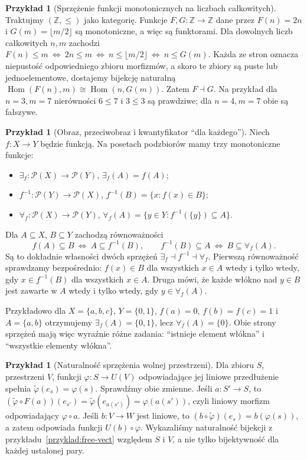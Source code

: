 \documentclass[11pt,a4paper]{article}
\numberwithin{equation}{section}
\theoremstyle{plain}
\theoremstyle{definition}
\newtheorem{przyklad}[twierdzenie]{Przykład}
\theoremstyle{remark}
\newcommand{\Hom}{\operatorname{Hom}}
\begin{document}
\begin{przyklad}[Sprzężenie funkcji monotonicznych na liczbach całkowitych]\label{przyklad:adj-poset}
Traktujmy $(\mathbb Z,\leq)$ jako kategorię. Funkcje $F,G:\mathbb Z\to\mathbb Z$ dane przez $F(n)=2n$ i $G(m)=\lfloor m/2\rfloor$ są monotoniczne, a więc są funktorami. Dla dowolnych liczb całkowitych $n,m$ zachodzi
$F(n)\leq m\ \Longleftrightarrow\ 2n\leq m\ \Longleftrightarrow\ n\leq\lfloor m/2\rfloor\ \Longleftrightarrow\ n\leq G(m)$.
Każda ze stron oznacza niepustość odpowiedniego zbioru morfizmów, a skoro te zbiory są puste lub jednoelementowe, dostajemy bijekcję naturalną $\Hom(F(n),m)\cong\Hom(n,G(m))$. Zatem $F\dashv G$. Na przykład dla $n=3,m=7$ nierówności $6\leq7$ i $3\leq3$ są prawdziwe; dla $n=4,m=7$ obie są fałszywe.
\end{przyklad}

\begin{przyklad}[Obraz, przeciwobraz i kwantyfikator ``dla każdego'']\label{przyklad:adj-inverse-image}
Niech $f:X\to Y$ będzie funkcją. Na posetach podzbiorów mamy trzy monotoniczne funkcje:
\begin{itemize}
\item $\exists_f:\mathcal P(X)\to\mathcal P(Y)$, $\exists_f(A)=f(A)$;
\item $f^{-1}:\mathcal P(Y)\to\mathcal P(X)$, $f^{-1}(B)=\{x:f(x)\in B\}$;
\item $\forall_f:\mathcal P(X)\to\mathcal P(Y)$, $\forall_f(A)=\{y\in Y:f^{-1}(\{y\})\subseteq A\}$.
\end{itemize}
Dla $A\subseteq X$, $B\subseteq Y$ zachodzą równoważności
\[
f(A)\subseteq B\ \Longleftrightarrow\ A\subseteq f^{-1}(B),\qquad
f^{-1}(B)\subseteq A\ \Longleftrightarrow\ B\subseteq\forall_f(A).
\]
Są to dokładnie własności dwóch sprzężeń $\exists_f\dashv f^{-1}\dashv\forall_f$. Pierwszą równoważność sprawdzamy bezpośrednio: $f(x)\in B$ dla wszystkich $x\in A$ wtedy i tylko wtedy, gdy $x\in f^{-1}(B)$ dla wszystkich $x\in A$. Druga mówi, że każde włókno nad $y\in B$ jest zawarte w $A$ wtedy i tylko wtedy, gdy $y\in\forall_f(A)$.

Przykładowo dla $X=\{a,b,c\}$, $Y=\{0,1\}$, $f(a)=0$, $f(b)=f(c)=1$ i $A=\{a,b\}$ otrzymujemy $\exists_f(A)=\{0,1\}$, lecz $\forall_f(A)=\{0\}$. Obie strony sprzężeń mają więc wyraźnie różne zadania: ``istnieje element włókna'' i ``wszystkie elementy włókna''.
\end{przyklad}

\begin{przyklad}[Naturalność sprzężenia wolnej przestrzeni]
Dla zbioru $S$, przestrzeni $V$, funkcji $\varphi:S\to U(V)$ odpowiadające jej liniowe przedłużenie spełnia $\widetilde\varphi(e_s)=\varphi(s)$. Sprawdźmy obie zmienne. Jeśli $a:S'\to S$, to $(\widetilde\varphi\circ F(a))(e_{s'})=\widetilde\varphi(e_{a(s')})=\varphi(a(s'))$, czyli liniowy morfizm odpowiadający $\varphi\circ a$. Jeśli $b:V\to W$ jest liniowe, to $(b\circ\widetilde\varphi)(e_s)=b(\varphi(s))$, a zatem odpowiada funkcji $U(b)\circ\varphi$. Wykazaliśmy naturalność bijekcji z przykładu~\ref{przyklad:free-vect} względem $S$ i $V$, a nie tylko bijektywność dla każdej ustalonej pary.
\end{przyklad}
\end{document}
